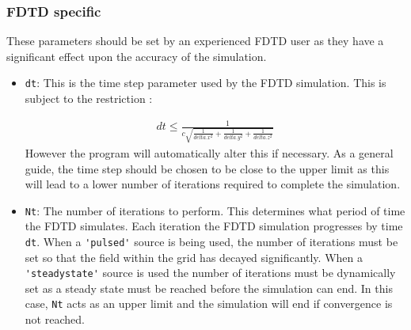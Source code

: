 \documentclass[a4paper, 12pt]{article}
\begin{document}
	\subsubsection{FDTD specific}
	These parameters should be set by an experienced FDTD user as they
	have a significant effect upon the accuracy of the simulation.
	\begin{itemize}
		\item \verb+dt+: This is the time step parameter used by the FDTD
		simulation. This is subject to the restriction \cite{taflove00book}:
		
		\begin{eqnarray}
			dt\le \frac{1}{c\sqrt{\frac{1}{delta.x^2}+\frac{1}{delta.y^2}+\frac{1}{delta.z^2}}}
		\end{eqnarray}
		However the program will automatically alter this if necessary. As a
		general guide, the time step should be chosen to be close to the
		upper limit as this will lead to a lower number of iterations
		required to complete the simulation.
		\item \verb+Nt+: The number of iterations to perform. This determines
		what period of time the FDTD simulates. Each iteration the FDTD
		simulation progresses by time \verb+dt+. When a \verb+'pulsed'+
		source is being used, the number of iterations
		must be set so that the field within the grid has decayed
		significantly. When a \verb+'steadystate'+ source is used the number
		of iterations must be dynamically set as a steady state must be
		reached before the simulation can end. In this case, \verb+Nt+ acts
		as an upper limit and the simulation will end if convergence is not reached.
	\end{itemize}
\end{document}
